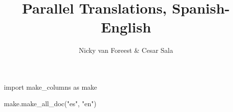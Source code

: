 \documentclass[a4paper]{article}
\author{Nicky van Foreest \& Cesar Sala}
\title{Parallel Translations, Spanish-English}
\begin{document}
\maketitle
\RaggedRight

\tableofcontents

\begin{pycode}
import make_columns as make

make.make_all_doc("es", "en")
\end{pycode}
\end{document}
